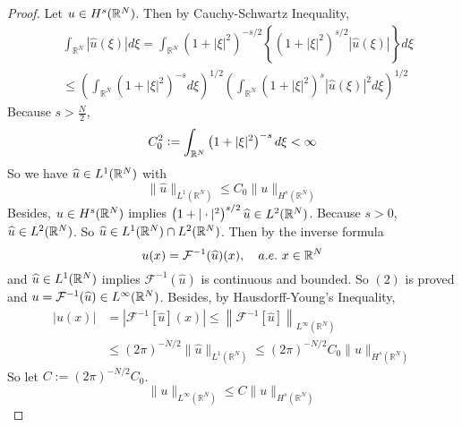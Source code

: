 \begin{proof}
	Let $u \in H^s(\mathbb{R}^N)$. Then by Cauchy-Schwartz Inequality,
	\begin{equation*}
		\begin{aligned}
			& \int_{\mathbb{R}^N}|\widehat{u}(\xi)| d \xi=\int_{\mathbb{R}^N}\left(1+|\xi|^2\right)^{-s / 2}\left\{\left(1+|\xi|^2\right)^{s / 2}|\widehat{u}(\xi)|\right\} d \xi \\
			& \leq\left(\int_{\mathbb{R}^N}\left(1+|\xi|^2\right)^{-s} d \xi\right)^{1 / 2}\left(\int_{\mathbb{R}^N}\left(1+|\xi|^2\right)^s|\widehat{u}(\xi)|^2 d \xi\right)^{1 / 2}
		\end{aligned}
	\end{equation*}
	Because $s > \frac{N}{2}$,
	\begin{equation*}
		C_0^2 \vcentcolon= \int_{\mathbb{R}^N}\left(1+|\xi|^2\right)^{-s} d \xi<\infty
	\end{equation*}
	So we have $\widehat{u} \in L^1(\mathbb{R}^N)$ with
	\begin{equation*}
		\|\widehat{u}\|_{L^1\left(\mathbb{R}^N\right)} \leq C_0\|u\|_{H^s\left(\mathbb{R}^N\right)}
	\end{equation*}
	Besides, $u \in H^s(\mathbb{R}^N)$ implies $\left(1+|\cdot|^2\right)^{s / 2} \widehat{u} \in L^2(\mathbb{R}^N)$. Because $s > 0$, $\widehat{u} \in L^2(\mathbb{R}^N)$. So $\widehat{u} \in L^1(\mathbb{R}^N)\cap L^2(\mathbb{R}^N)$. Then by the inverse formula
	\begin{equation*}
		u(x)=\mathcal{F}^{-1}(\widehat{u})(x), \quad a.e.~x \in \mathbb{R}^N
	\end{equation*}
	and $\widehat{u} \in L^1(\mathbb{R}^N)$ implies $\mathcal{F}^{-1}(\widehat{u})$ is continuous and bounded. So $(2)$ is proved and $u = \mathcal{F}^{-1}(\widehat{u}) \in L^\infty(\mathbb{R}^N)$. Besides, by Hausdorff-Young's Inequality,
	\begin{equation*}
		\begin{aligned}
			|u(x)| & =\left|\mathcal{F}^{-1}[\widehat{u}](x)\right| \leq\left\|\mathcal{F}^{-1}[\widehat{u}]\right\|_{L^{\infty}\left(\mathbb{R}^N\right)} \\
			& \leq(2 \pi)^{-N / 2}\|\widehat{u}\|_{L^1\left(\mathbb{R}^N\right)} \leq(2 \pi)^{-N / 2} C_0\|u\|_{H^s\left(\mathbb{R}^N\right)}
		\end{aligned}
	\end{equation*}
	So let $C:=(2 \pi)^{-N / 2} C_0$.
	\begin{equation*}
		\|u\|_{L^{\infty}\left(\mathbb{R}^N\right)} \leq C\|u\|_{H^s\left(\mathbb{R}^N\right)}
	\end{equation*}
\end{proof}

